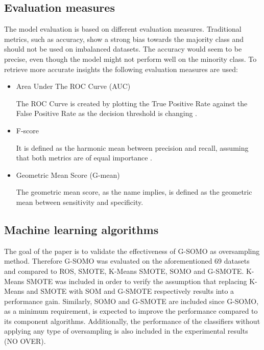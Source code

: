 \documentclass[parskip=full]{scrartcl}
\begin{document}
\subsection{Evaluation measures}

The model evaluation is based on different evaluation measures. Traditional metrics, such as accuracy, show a strong bias towards the majority class and should not be used on imbalanced datasets. The accuracy would seem to be precise, even though the model might not perform well on the minority class. To retrieve more accurate insights the following evaluation measures are used:

\begin{itemize}

	\renewcommand\labelitemi{--}

	\item Area Under The ROC Curve (AUC)
	
	The ROC Curve is created by plotting the True Positive Rate against the False Positive Rate as the decision threshold is changing \cite{Hand2009}.

	\item F-score
	
	It is defined as the harmonic mean between precision and recall, assuming that both metrics are of equal importance \cite{Guo2018}.

	\item Geometric Mean Score (G-mean)
	
	The geometric mean score, as the name implies, is defined as the geometric mean between sensitivity and specificity.

\end{itemize}

\subsection{Machine learning algorithms}

The goal of the paper is to validate the effectiveness of G-SOMO as oversampling method. Therefore G-SOMO was evaluated on the aforementioned 69 datasets and compared to ROS, SMOTE, K-Means SMOTE, SOMO and G-SMOTE. K-Means SMOTE was included in order to verify the assumption that replacing K-Means and SMOTE with SOM and G-SMOTE respectively results into a performance gain. Similarly, SOMO and G-SMOTE are included since G-SOMO, as a minimum requirement, is expected to improve the performance compared to its component algorithms. Additionally, the performance of the classifiers without applying any type of oversampling is also included in the experimental results (NO OVER).
\end{document}
